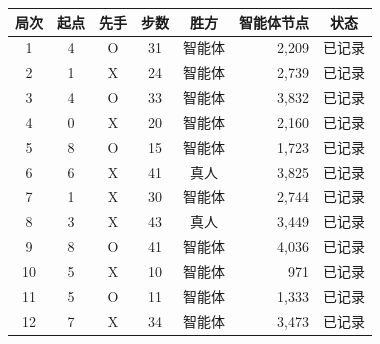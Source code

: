 \begin{tabular}{cccccrc}
\toprule
局次 & 起点 & 先手 & 步数 & 胜方 & 智能体节点 & 状态 \\
\midrule
1 & 4 & O & 31 & 智能体 & 2,209 & 已记录 \\
2 & 1 & X & 24 & 智能体 & 2,739 & 已记录 \\
3 & 4 & O & 33 & 智能体 & 3,832 & 已记录 \\
4 & 0 & X & 20 & 智能体 & 2,160 & 已记录 \\
5 & 8 & O & 15 & 智能体 & 1,723 & 已记录 \\
6 & 6 & X & 41 & 真人 & 3,825 & 已记录 \\
7 & 1 & X & 30 & 智能体 & 2,744 & 已记录 \\
8 & 3 & X & 43 & 真人 & 3,449 & 已记录 \\
9 & 8 & O & 41 & 智能体 & 4,036 & 已记录 \\
10 & 5 & X & 10 & 智能体 & 971 & 已记录 \\
11 & 5 & O & 11 & 智能体 & 1,333 & 已记录 \\
12 & 7 & X & 34 & 智能体 & 3,473 & 已记录 \\
\bottomrule
\end{tabular}
